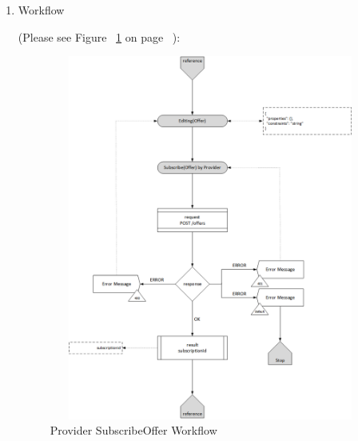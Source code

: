 \begin{enumerate}
\begin{center}
\begin{tabular}{|p{3cm}|l|p{3cm}|p{3cm}|p{4cm}|}
\hline

\end{tabular}
\end{center}


\item Workflow

(Please see Figure ~\ref{fig:SubsOffer} on page ~\pageref{fig:SubsOffer}):

\begin{figure}[htbp]
    \centering
    \includegraphics[width=12cm,height=12cm,angle=0]{./diag/Workflow/Market/SubscribeOffer-P-Workflow.png}
    \caption{Provider SubscribeOffer Workflow}
	\label{fig:SubsOffer}
\end{figure}


\end{enumerate}

\newpage


